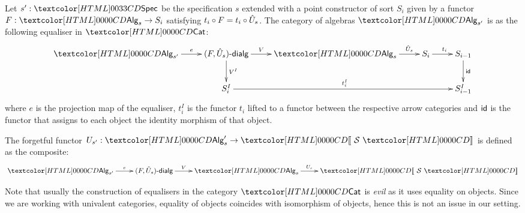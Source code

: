 \begin{definition}
  Let $s' : \specty$ be the specification $s$ extended with a
  point constructor of sort $S_i$ given by a functor $F : \Alg_s \to S_i$
  satisfying $t_i \circ F = t_i \circ \hat{U}_s$. The category of
  algebras $\Alg_{s'}$ is as the following equaliser in $\Cat$:
  \[
  \xymatrix{
    \Alg_{s'} \ar[r]^-{e} &\dialgcat{F}{\extendfunc{U}_s} \ar[r]^-{V} \ar[d]^-{V^I} &\Alg_s \ar[r]^-{\extendfunc{U}_s} &S_i \ar[r]^{t_i} &S_{i-1} \ar[d]^-{\id} \\
    &S_i^I \ar[rrr]^{t_i^I} && &S_{i-1}^I }
  \]
  where $e$ is the projection map of the equaliser, $t_i^I$ is the
  functor $t_i$ lifted to a functor between the respective arrow
  categories and $\id$ is the functor that assigns to each object the
  identity morphism of that object.

  The forgetful functor $U_{s'} : \Alg_s' \to \SortCat{\Ss}$ is defined as the composite:
  \[
    \xymatrix{
      \Alg_{s'} \ar[r]^-{e} &\dialgcat{F}{\extendfunc{U}_s} \ar[r]^-{V} &\Alg_s \ar[r]^-{U_s} &\SortCat{\Ss}
    }
  \]
\end{definition}

Note that usually the construction of equalisers in the category
$\Cat$ is \emph{evil} as it uses equality on objects. Since we are
working with univalent categories, equality of objects coincides with
isomorphism of objects, hence this is not an issue in our setting.

